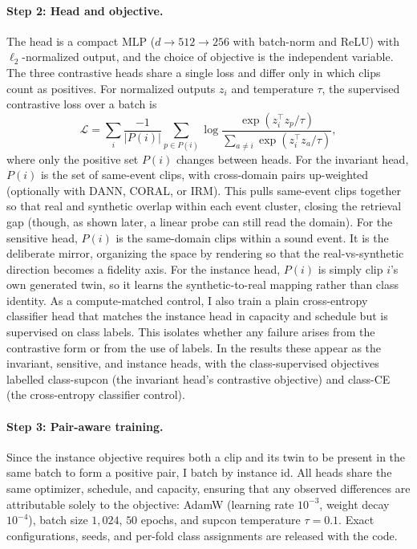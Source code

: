 \documentclass{article}
\begin{document}
\paragraph{Step 2: Head and objective.} The head is a compact MLP ($d\!\to\!512\!\to\!256$ with batch-norm and ReLU) with $\ell_2$-normalized output, and the choice of objective is the independent variable. The three contrastive heads share a single loss and differ only in which clips count as positives. For normalized outputs $z_i$ and temperature $\tau$, the supervised contrastive loss over a batch is
\begin{equation*}
\mathcal{L}=\sum_i \frac{-1}{|P(i)|}\sum_{p\in P(i)}\log\frac{\exp(z_i^{\top} z_p/\tau)}{\sum_{a\neq i}\exp(z_i^{\top} z_a/\tau)},
\end{equation*}
where only the positive set $P(i)$ changes between heads. For the invariant head, $P(i)$ is the set of same-event clips, with cross-domain pairs up-weighted (optionally with DANN, CORAL, or IRM). This pulls same-event clips together so that real and synthetic overlap within each event cluster, closing the retrieval gap (though, as shown later, a linear probe can still read the domain). For the sensitive head, $P(i)$ is the same-domain clips within a sound event. It is the deliberate mirror, organizing the space by rendering so that the real-vs-synthetic direction becomes a fidelity axis. For the instance head, $P(i)$ is simply clip $i$'s own generated twin, so it learns the synthetic-to-real mapping rather than class identity. As a compute-matched control, I also train a plain cross-entropy classifier head that matches the instance head in capacity and schedule but is supervised on class labels. This isolates whether any failure arises from the contrastive form or from the use of labels. In the results these appear as the invariant, sensitive, and instance heads, with the class-supervised objectives labelled class-supcon (the invariant head's contrastive objective) and class-CE (the cross-entropy classifier control).

\paragraph{Step 3: Pair-aware training.} Since the instance objective requires both a clip and its twin to be present in the same batch to form a positive pair, I batch by instance id. All heads share the same optimizer, schedule, and capacity, ensuring that any observed differences are attributable solely to the objective: AdamW (learning rate $10^{-3}$, weight decay $10^{-4}$), batch size $1{,}024$, $50$ epochs, and supcon temperature $\tau=0.1$. Exact configurations, seeds, and per-fold class assignments are released with the code.
\end{document}
